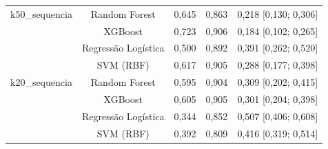 \begin{table}[htbp]
\begin{tabular}{lcccc}
    k50\_sequencia & Random Forest & 0,645 & 0,863 & 0,218 [0,130; 0,306] \\
     & XGBoost & 0,723 & 0,906 & 0,184 [0,102; 0,265] \\
     & Regressão Logística & 0,500 & 0,892 & 0,391 [0,262; 0,520] \\
     & SVM (RBF) & 0,617 & 0,905 & 0,288 [0,177; 0,398] \\
    k20\_sequencia & Random Forest & 0,595 & 0,904 & 0,309 [0,202; 0,415] \\
     & XGBoost & 0,605 & 0,905 & 0,301 [0,204; 0,398] \\
     & Regressão Logística & 0,344 & 0,852 & 0,507 [0,406; 0,608] \\
     & SVM (RBF) & 0,392 & 0,809 & 0,416 [0,319; 0,514] \\
    \bottomrule
  \end{tabular}
\end{table}
